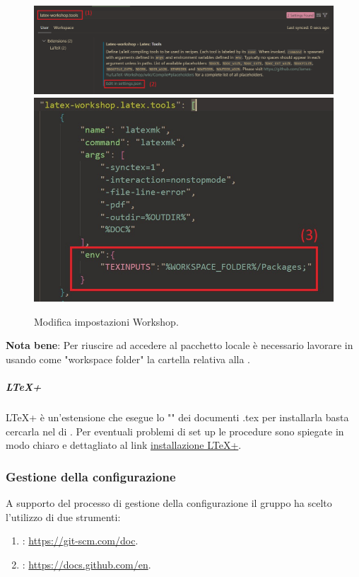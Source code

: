 \begin{figure}[H]
    \center
    \includegraphics[scale=0.4]{Sezioni/ProcessiDiSupporto/Immagini/texinputs_setup.png}
    \includegraphics[]{Sezioni/ProcessiDiSupporto/Immagini/texinputs_setup_json.jpg}
    \caption{Modifica impostazioni  Workshop.}
    \label{fig:texinputs}
\end{figure}
\textbf{Nota bene}: Per riuscire ad accedere al pacchetto locale è necessario lavorare in  usando come "workspace folder" la cartella relativa alla .

\subparagraph{LTeX+}
LTeX+ è un'estensione che esegue lo "" dei documenti .tex per installarla basta cercarla nel  di .
Per eventuali problemi di set up le procedure sono spiegate in modo chiaro e dettagliato al link \href{https://ltex-plus.github.io/ltex-plus/vscode-ltex-plus/setting-scopes-files.html}{installazione LTeX+}.

\subsubsection{Gestione della configurazione}
A supporto del processo di gestione della configurazione il gruppo ha scelto l'utilizzo di due strumenti:
\begin{enumerate}
    \item {}: \href{https://git-scm.com/doc}{https://git-scm.com/doc}.
    \item {}: \href{https://docs.github.com/en}{https://docs.github.com/en}.
\end{enumerate}

